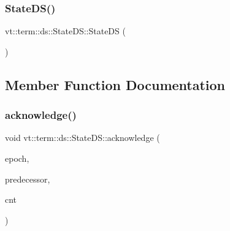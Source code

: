 \mbox{\label{structvt_1_1term_1_1ds_1_1_state_d_s_a83663b5cf3c5cc43eaa8bb0bd5edee31}} 
\subsubsection{\texorpdfstring{State\+D\+S()}{StateDS()}\hspace{0.1cm}{\footnotesize\ttfamily [3/3]}}
{\footnotesize\ttfamily vt\+::term\+::ds\+::\+State\+D\+S\+::\+State\+DS (\begin{DoxyParamCaption}\item[{\hyperlink{structvt_1_1term_1_1ds_1_1_state_d_s}{State\+DS} const \&}]{ }\end{DoxyParamCaption})\hspace{0.3cm}{\ttfamily [delete]}}



\subsection{Member Function Documentation}
\mbox{\label{structvt_1_1term_1_1ds_1_1_state_d_s_a60aafca7a5eef1368e55c02508a0f3bf}} 
\subsubsection{\texorpdfstring{acknowledge()}{acknowledge()}}
{\footnotesize\ttfamily void vt\+::term\+::ds\+::\+State\+D\+S\+::acknowledge (\begin{DoxyParamCaption}\item[{\hyperlink{namespacevt_a81d11b28122d43bf9834577e4a06440f}{Epoch\+Type}}]{epoch,  }\item[{\hyperlink{structvt_1_1term_1_1ds_1_1_state_d_s_aba302de614dd639f5d93f4f5b6dd6108}{Endpoint}}]{predecessor,  }\item[{int64\+\_\+t}]{cnt }\end{DoxyParamCaption})\hspace{0.3cm}{\ttfamily [static]}}



